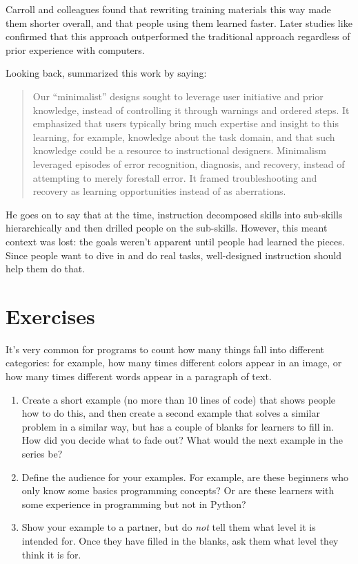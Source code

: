 Carroll and colleagues found that rewriting training materials this
way made them shorter overall, and that people using them learned
faster.  Later studies like \cite{Lazo1993} confirmed that this
approach outperformed the traditional approach regardless of prior
experience with computers.

Looking back, \cite{Carr2014} summarized this work by saying:

\begin{quote}

  Our ``minimalist'' designs sought to leverage user initiative and
  prior knowledge, instead of controlling it through warnings and
  ordered steps. It emphasized that users typically bring much
  expertise and insight to this learning, for example, knowledge about
  the task domain, and that such knowledge could be a resource to
  instructional designers. Minimalism leveraged episodes of error
  recognition, diagnosis, and recovery, instead of attempting to
  merely forestall error. It framed troubleshooting and recovery as
  learning opportunities instead of as aberrations.

\end{quote}

He goes on to say that at the time, instruction decomposed skills into
sub-skills hierarchically and then drilled people on the sub-skills.
However, this meant context was lost: the goals weren't apparent until
people had learned the pieces.  Since people want to dive in and do
real tasks, well-designed instruction should help them do that.

\section{Exercises}\label{s:load-exercises}


It's very common for programs to count how many things fall into
different categories: for example, how many times different colors
appear in an image, or how many times different words appear in a
paragraph of text.

\begin{enumerate}

\item
  Create a short example (no more than 10 lines of code) that shows
  people how to do this, and then create a second example that solves
  a similar problem in a similar way, but has a couple of blanks for
  learners to fill in. How did you decide what to fade out? What would
  the next example in the series be?

\item
  Define the audience for your examples. For example, are these
  beginners who only know some basics programming concepts? Or are
  these learners with some experience in programming but not in
  Python?

\item
  Show your example to a partner, but do \emph{not} tell them what
  level it is intended for. Once they have filled in the blanks, ask
  them what level they think it is for.

\end{enumerate}

